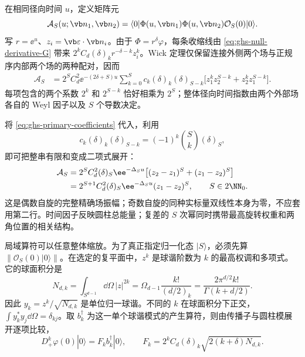 \begin{proposition}[高自旋双场插入的精确振幅]
在相同径向时间 $u$，定义矩阵元
\begin{equation}\label{eq:ghs-field-amplitude-definition}
 \mathcal A_S(u;\vb n_1,\vb n_2)
 =\langle0|\Phi(u,\vb n_1)\Phi(u,\vb n_2)
 \mathcal O_S(0)|0\rangle.
\end{equation}
写 $r=\ee^u$、$z_i=\vb\varepsilon\cdot\vb n_i$。由于 $\Phi=r^\delta\varphi$，每条收缩线由 \cref{eq:ghs-null-derivative-G} 带来 $2^k C_d(\delta)_k r^{-\delta-k}z_i^k$。Wick 定理仅保留连接外侧两个场与正规序内部两个场的两种配对，因而
\begin{align}\label{eq:ghs-wick-sum}
 \mathcal A_S&=2^S C_d^2\ee^{-(2\delta+S)u}
 \sum_{k=0}^S c_k(\delta)_k(\delta)_{S-k}
 \bigl[z_1^kz_2^{S-k}+z_2^kz_1^{S-k}\bigr].
\end{align}
每项包含的两个系数 $2^k$ 和 $2^{S-k}$ 恰好相乘为 $2^S$；整体径向时间指数由两个外部场各自的 Weyl 因子以及 $S$ 个导数决定。

将 \cref{eq:ghs-primary-coefficients} 代入，利用
\begin{equation*}
 c_k(\delta)_k(\delta)_{S-k}=(-1)^k\binom Sk(\delta)_S,
\end{equation*}
即可把整串有限和变成二项式展开：
\begin{align}\label{eq:ghs-amplitude-exact}
 \mathcal A_S
 &=2^SC_d^2(\delta)_S\ee^{-\Delta_Su}
 \bigl[(z_2-z_1)^S+(z_1-z_2)^S\bigr]\\
 &=2^{S+1}C_d^2(\delta)_S\ee^{-\Delta_Su}(z_1-z_2)^S,
 \qquad S\in2\NN_0.\notag
\end{align}
这是偶数自旋的完整精确场振幅；奇数自旋的同种实标量双线性本身为零，不应套用第二行。时间因子反映圆柱总能量；复差的 $S$ 次幂同时携带最高旋转权重和两角位置的相关结构。
\end{proposition}

局域算符可以任意整体缩放。为了真正指定归一化态 $|S\rangle$，必须先算 $\|\mathcal O_S(0)|0\rangle\|$。在选定的复平面中，$z^k$ 是球谐阶数为 $k$ 的最高权调和多项式。它的球面积分是
\begin{equation}\label{eq:ghs-highest-harmonic-norm}
 N_{d,k}=\int_{S^{d-1}}\dd\Omega\,|z|^{2k}
 =\Omega_{d-1}\frac{k!}{(d/2)_k}
 =\frac{2\pi^{d/2}k!}{\Gamma(k+d/2)}.
\end{equation}
因此 $y_k=z^k/\sqrt{N_{d,k}}$ 是单位归一球谐。不同的 $k$ 在球面积分下正交，$\int y_k^*y_j\dd\Omega=\delta_{kj}$。取 $b_k^\dagger$ 为这一单个球谐模式的产生算符，则由传播子与圆柱模展开逐项比较，
\begin{equation}\label{eq:ghs-local-derivative-state}
 D_+^k\varphi(0)|0\rangle=F_kb_k^\dagger|0\rangle,
 \qquad F_k=2^k C_d(\delta)_k\sqrt{2(k+\delta)N_{d,k}}.
\end{equation}


